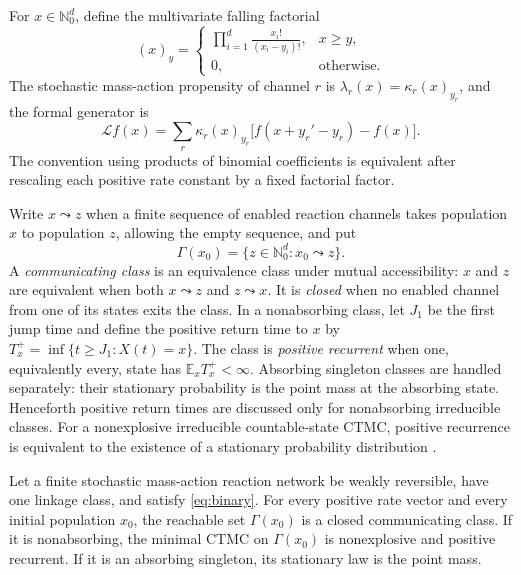 For \(x\in\mathbb N_0^d\), define the multivariate falling factorial
\begin{equation}\label{eq:falling}
  (x)_y=
  \begin{cases}
  \displaystyle\prod_{i=1}^d\frac{x_i!}{(x_i-y_i)!},&x\ge y,\\[1ex]
  0,&\text{otherwise}.
  \end{cases}
\end{equation}
The stochastic mass-action propensity of channel \(r\) is
\(\lambda_r(x)=\kappa_r(x)_{y_r}\), and the formal generator is
\begin{equation}\label{eq:generator}
  \mathcal Lf(x)=\sum_r\kappa_r(x)_{y_r}
  \bigl[f(x+y_r'-y_r)-f(x)\bigr].
\end{equation}
The convention using products of binomial coefficients is equivalent after
rescaling each positive rate constant by a fixed factorial factor.

Write \(x\leadsto z\) when a finite sequence of enabled reaction channels
takes population \(x\) to population \(z\), allowing the empty sequence, and
put
\[
  \Gamma(x_0)=\{z\in\mathbb N_0^d:x_0\leadsto z\}.
\]
A \emph{communicating class} is an equivalence class under mutual
accessibility: \(x\) and \(z\) are equivalent when both \(x\leadsto z\) and
\(z\leadsto x\).  It is \emph{closed} when no enabled channel from one of its
states exits the class.  In a nonabsorbing class, let \(J_1\) be the first
jump time and define the positive return time to \(x\) by
\(T_x^+=\inf\{t\ge J_1:X(t)=x\}\).  The class is \emph{positive recurrent}
when one, equivalently every, state has \(\mathbb E_xT_x^+<\infty\).
Absorbing singleton classes are handled separately: their stationary
probability is the point mass at the absorbing state.  Henceforth positive
return times are discussed only for nonabsorbing irreducible classes.  For a
nonexplosive irreducible countable-state CTMC, positive recurrence is
equivalent to the existence of a stationary probability distribution
\citep{Norris1997}.

\begin{theorem}\label{thm:main}
Let a finite stochastic mass-action reaction network be weakly reversible,
have one linkage class, and satisfy \eqref{eq:binary}.  For every positive rate
vector and every initial population \(x_0\), the reachable set
\(\Gamma(x_0)\) is a closed communicating class.  If it is nonabsorbing, the
minimal CTMC on \(\Gamma(x_0)\) is nonexplosive and positive recurrent.  If it
is an absorbing singleton, its stationary law is the point mass.
\end{theorem}

